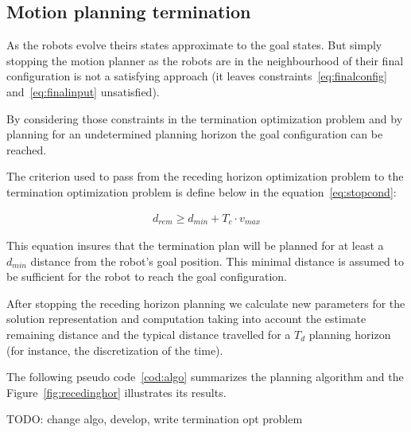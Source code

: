 \documentclass[eprint]{actapoly}
\begin{document}
\subsection{Motion planning termination}


As the robots evolve theirs states approximate to the goal states.
But simply stopping the motion planner as the robots are in the neighbourhood of
their final configuration is not a satisfying approach (it leaves 
constraints~\ref{eq:finalconfig} and~\ref{eq:finalinput} unsatisfied).


By considering those constraints in the termination optimization problem and by planning for
an undetermined planning horizon the goal configuration can be reached.


The criterion used to pass from the receding horizon optimization problem to the termination optimization problem
is define below in the equation~\ref{eq:stopcond}:

\begin{align}\label{eq:stopcond}
  d_{rem} \geq d_{min} + T_c \cdot v_{max}
\end{align}

This equation insures that the termination plan will be planned for at least a 
$d_{min}$ distance from the robot's goal position.
This minimal distance is assumed to be sufficient for the robot to reach the 
goal configuration.

After stopping the receding horizon planning we calculate new parameters for the 
solution representation and computation taking into
account the estimate remaining distance and the typical distance travelled
for a $T_d$ planning horizon (for instance, the discretization of the time).

The following pseudo code~\ref{cod:algo} summarizes the planning algorithm
and the Figure~\ref{fig:recedinghor} illustrates its results.

TODO: change algo, develop, write termination opt problem
\end{document}
